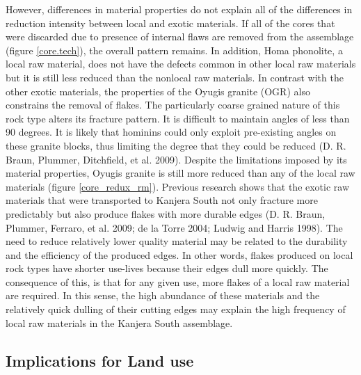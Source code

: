 \documentclass[]{elsarticle} %
\begin{document}
However, differences in material properties do not explain all of the
differences in reduction intensity between local and exotic materials.
If all of the cores that were discarded due to presence of internal
flaws are removed from the assemblage (figure \ref{core.tech}), the
overall pattern remains. In addition, Homa phonolite, a local raw
material, does not have the defects common in other local raw materials
but it is still less reduced than the nonlocal raw materials. In
contrast with the other exotic materials, the properties of the Oyugis
granite (OGR) also constrains the removal of flakes. The particularly
coarse grained nature of this rock type alters its fracture pattern. It
is difficult to maintain angles of less than 90 degrees. It is likely
that hominins could only exploit pre-existing angles on these granite
blocks, thus limiting the degree that they could be reduced (D. R.
Braun, Plummer, Ditchfield, et al. 2009). Despite the limitations
imposed by its material properties, Oyugis granite is still more reduced
than any of the local raw materials (figure \ref{core_redux_rm}).
Previous research shows that the exotic raw materials that were
transported to Kanjera South not only fracture more predictably but also
produce flakes with more durable edges (D. R. Braun, Plummer, Ferraro,
et al. 2009; de la Torre 2004; Ludwig and Harris 1998). The need to
reduce relatively lower quality material may be related to the
durability and the efficiency of the produced edges. In other words,
flakes produced on local rock types have shorter use-lives because their
edges dull more quickly. The consequence of this, is that for any given
use, more flakes of a local raw material are required. In this sense,
the high abundance of these materials and the relatively quick dulling
of their cutting edges may explain the high frequency of local raw
materials in the Kanjera South assemblage.

\hypertarget{implications-for-land-use}{%
\subsection{Implications for Land use}\label{implications-for-land-use}}
\end{document}
